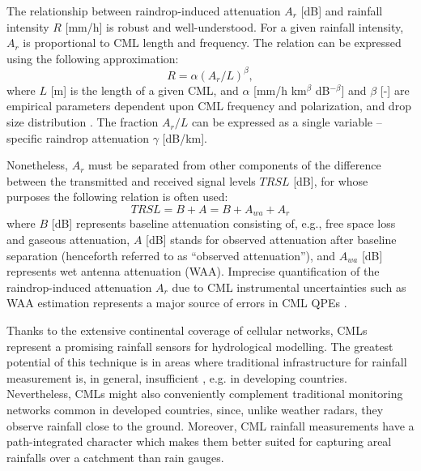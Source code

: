 \documentclass{ctuthesis}\usepackage[]{graphicx}\usepackage[]{color}
\begin{document}
The relationship between raindrop-induced attenuation $A_r$ [dB] and rainfall intensity $R$ [mm/h] is robust and well-understood. For a given rainfall intensity, $A_r$ is proportional to CML length and frequency. The relation can be expressed using the following approximation:
        \begin{equation} \label{eq:2eq1}
        R = \alpha (A_r / L)^\beta,
        \end{equation}
where $L$ [m] is the length of a given CML, and $\alpha$ [mm/h km$^\beta$ dB$^{-\beta}$] and $\beta$ [-] are empirical parameters dependent upon CML frequency and polarization, and drop size distribution \citep{olsenARbRelationCalculation1978}. The fraction $A_r / L$ can be expressed as a single variable -- specific raindrop attenuation $\gamma$ [dB/km].

Nonetheless, $A_r$ must be separated from other components of the difference between the transmitted and received signal levels $TRSL$ [dB], for whose purposes the following relation is often used: 
        \begin{equation} \label{eq:2eq2}
        TRSL = B + A = B + A_{wa} + A_r
        \end{equation}
where $B$ [dB] represents baseline attenuation consisting of, e.g., free space loss and gaseous attenuation, $A$ [dB] stands for observed attenuation after baseline separation (henceforth referred to as “observed attenuation”), and $A_{wa}$ [dB] represents wet antenna attenuation (WAA). Imprecise quantification of the raindrop-induced attenuation $A_r$ due to CML instrumental uncertainties such as WAA estimation represents a major source of errors in CML QPEs \citep[][more details in \ref{InstErr}]{chwalaCommercialMicrowaveLink2019}.


Thanks to the extensive continental coverage of cellular networks, CMLs represent a promising rainfall sensors for hydrological modelling. The greatest potential of this technique is in areas where traditional infrastructure for rainfall measurement is, in general, insufficient \citep{gossetImprovingRainfallMeasurement2016}, e.g. in developing countries. Nevertheless, CMLs might also conveniently complement traditional monitoring networks common in developed countries, since, unlike weather radars, they observe rainfall close to the ground. Moreover, CML rainfall measurements have a path-integrated character which makes them better suited for capturing areal rainfalls over a catchment than rain gauges. 
\end{document}
